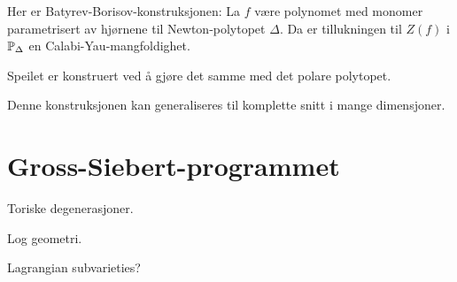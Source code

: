\documentclass[11pt, norsk]{article}
\begin{document}
Her er Batyrev-Borisov-konstruksjonen: La $f$ være polynomet med monomer parametrisert av hjørnene til Newton-polytopet $\Delta$. Da er tillukningen til $Z(f)$ i $\mathbb{P}_\Delta$ en Calabi-Yau-mangfoldighet.

Speilet er konstruert ved å gjøre det samme med det polare polytopet.

Denne konstruksjonen kan generaliseres til komplette snitt i mange dimensjoner.

\section{Gross-Siebert-programmet}

Toriske degenerasjoner.

Log geometri.

Lagrangian subvarieties? 
\end{document}
